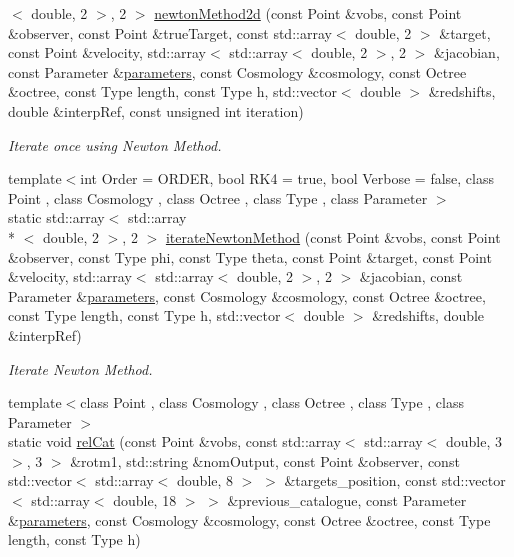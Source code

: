 \begin{DoxyCompactItemize}
$<$ double, 2 $>$, 2 $>$ \hyperlink{classCatalogues_a8f6459496f108e69812ab20cfff613e8}{newton\-Method2d} (const Point \&vobs, const Point \&observer, const Point \&true\-Target, const std\-::array$<$ double, 2 $>$ \&target, const Point \&velocity, std\-::array$<$ std\-::array$<$ double, 2 $>$, 2 $>$ \&jacobian, const Parameter \&\hyperlink{rays_8h_ae1bc8b0b8c8b9f8e4cc61a5cc7c4ce9e}{parameters}, const Cosmology \&cosmology, const Octree \&octree, const Type length, const Type h, std\-::vector$<$ double $>$ \&redshifts, double \&interp\-Ref, const unsigned int iteration)
\begin{DoxyCompactList}\small\item\em Iterate once using Newton Method. \end{DoxyCompactList}\item 
{\footnotesize template$<$int Order = O\-R\-D\-E\-R, bool R\-K4 = true, bool Verbose = false, class Point , class Cosmology , class Octree , class Type , class Parameter $>$ }\\static std\-::array$<$ std\-::array\\*
$<$ double, 2 $>$, 2 $>$ \hyperlink{classCatalogues_a71bb381e7c748cb60ac46aaed3f59490}{iterate\-Newton\-Method} (const Point \&vobs, const Point \&observer, const Type phi, const Type theta, const Point \&target, const Point \&velocity, std\-::array$<$ std\-::array$<$ double, 2 $>$, 2 $>$ \&jacobian, const Parameter \&\hyperlink{rays_8h_ae1bc8b0b8c8b9f8e4cc61a5cc7c4ce9e}{parameters}, const Cosmology \&cosmology, const Octree \&octree, const Type length, const Type h, std\-::vector$<$ double $>$ \&redshifts, double \&interp\-Ref)
\begin{DoxyCompactList}\small\item\em Iterate Newton Method. \end{DoxyCompactList}\item 
{\footnotesize template$<$class Point , class Cosmology , class Octree , class Type , class Parameter $>$ }\\static void \hyperlink{classCatalogues_a6ce823be2d00ce5fbc609c36585d749c}{rel\-Cat} (const Point \&vobs, const std\-::array$<$ std\-::array$<$ double, 3 $>$, 3 $>$ \&rotm1, std\-::string \&nom\-Output, const Point \&observer, const std\-::vector$<$ std\-::array$<$ double, 8 $>$ $>$ \&targets\-\_\-position, const std\-::vector$<$ std\-::array$<$ double, 18 $>$ $>$ \&previous\-\_\-catalogue, const Parameter \&\hyperlink{rays_8h_ae1bc8b0b8c8b9f8e4cc61a5cc7c4ce9e}{parameters}, const Cosmology \&cosmology, const Octree \&octree, const Type length, const Type h)

\end{DoxyCompactItemize}
